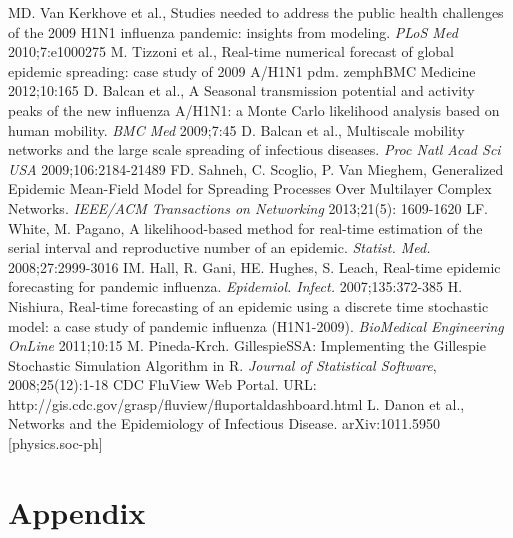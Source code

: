 \documentclass[11pt, a4paper, oneside,titlepage]{article}
\begin{document}
\begin{thebibliography}{1}
	MD. Van Kerkhove et al., Studies needed to address the public health challenges of the 2009 H1N1 influenza pandemic: insights from modeling. \emph{PLoS Med} 2010;7:e1000275
	M. Tizzoni et al., Real-time numerical forecast of global epidemic spreading: case study of 2009 A/H1N1 pdm. zemph{BMC Medicine} 2012;10:165
	D. Balcan et al., A Seasonal transmission potential and activity peaks of the new influenza A/H1N1: a Monte Carlo likelihood analysis based on human mobility. \emph{BMC Med} 2009;7:45
	D. Balcan et al., Multiscale mobility networks and the large scale spreading of infectious diseases. \emph{Proc Natl Acad Sci USA} 2009;106:2184-21489
	FD. Sahneh, C. Scoglio, P. Van Mieghem, Generalized Epidemic Mean-Field Model for Spreading Processes Over Multilayer Complex Networks. \emph{IEEE/ACM Transactions on Networking} 2013;21(5): 1609-1620
LF. White, M. Pagano, A likelihood-based method for real-time estimation of the serial interval and reproductive number of an epidemic. \emph{Statist. Med.} 2008;27:2999-3016
IM. Hall, R. Gani, HE. Hughes, S. Leach, Real-time epidemic forecasting for pandemic influenza. \emph{Epidemiol. Infect.} 2007;135:372-385
H. Nishiura, Real-time forecasting of an epidemic using a discrete time stochastic model: a case study of pandemic influenza (H1N1-2009). \emph{BioMedical Engineering OnLine} 2011;10:15
	M. Pineda-Krch. GillespieSSA: Implementing the Gillespie Stochastic Simulation Algorithm in R. \emph{Journal of Statistical Software}, 2008;25(12):1-18
	CDC FluView Web Portal. URL: http://gis.cdc.gov/grasp/fluview/fluportaldashboard.html
	L. Danon et al., Networks and the Epidemiology of Infectious Disease. arXiv:1011.5950 [physics.soc-ph]

\end{thebibliography}

\section*{Appendix}
\end{document}
